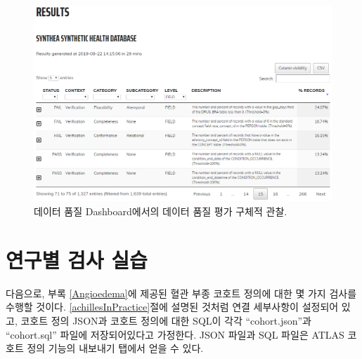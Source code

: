 \documentclass[10.5pt]{book}
\newenvironment{Shaded}{\begin{snugshade}}{\end{snugshade}}
\newcommand{\KeywordTok}[1]{\textcolor[rgb]{0.13,0.29,0.53}{\textbf{#1}}}
\newcommand{\DataTypeTok}[1]{\textcolor[rgb]{0.13,0.29,0.53}{#1}}
\newcommand{\StringTok}[1]{\textcolor[rgb]{0.31,0.60,0.02}{#1}}
\newcommand{\OperatorTok}[1]{\textcolor[rgb]{0.81,0.36,0.00}{\textbf{#1}}}
\newcommand{\NormalTok}[1]{#1}
\theoremstyle{definition}
\theoremstyle{definition}
\theoremstyle{definition}
\theoremstyle{remark}
\begin{document}
\begin{figure}

{\centering \includegraphics[width=1\linewidth]{images/DataQuality/dqdResults} 

}

\caption{데이터 품질 Dashboard에서의 데이터 품질 평가 구체적 관찰.}\label{fig:dqdResults}
\end{figure}

\section{연구별 검사 실습}\label{--}

다음으로, 부록 \ref{Angioedema}에 제공된 혈관 부종 코호트 정의에 대한 몇
가지 검사를 수행할 것이다. \ref{achillesInPractice}절에 설명된 것처럼
연결 세부사항이 설정되어 있고, 코호트 정의 JSON과 코호트 정의에 대한
SQL이 각각 ``cohort.json''과 ``cohort.sql'' 파일에 저장되어있다고
가정한다. JSON 파일과 SQL 파일은 ATLAS 코호트 정의 기능의 내보내기
탭에서 얻을 수 있다.

\begin{Shaded}
\end{Shaded}
\end{document}
